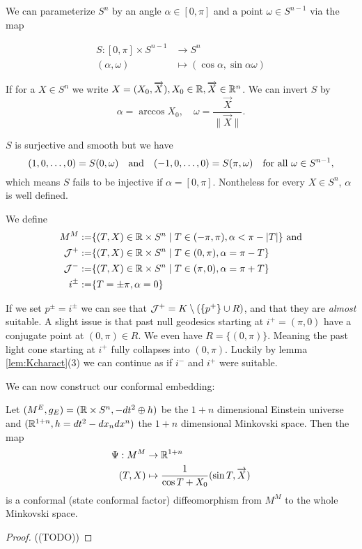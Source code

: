 \begin{remark}
We can parameterize $S^n$ by an angle $\alpha\in [0,\pi]$ and a point $\omega\in S^{n-1}$ via the map 

\begin{align*}
    S:[0,\pi]\times S^{n-1}&\to S^n \\
    (\alpha,\omega) &\mapsto (\cos \alpha, \sin \alpha \omega)
\end{align*}

If for a $X\in S^n$ we write $X=(X_0,\overrightarrow{X}), X_0\in \mathbb{R}, \overrightarrow{X}\in \mathbb{R}^n$. We can invert $S$ by 
\[
    \alpha = \arccos X_0, \quad \omega=\frac{\overrightarrow{X}}{\lVert\overrightarrow{X}\rVert}.
\]

$S$ is surjective and smooth but we have 
\[(1,0,\dots, 0) = S(0,\omega) \quad \text{and} \quad (-1,0,\dots,0)=S(\pi,\omega) \quad \text{for all }\omega\in {S^{n-1}},\]
which means $S$ fails to be injective if $\alpha = [0,\pi]$. Nontheless for every $X\in S^n$, $\alpha$ is well defined.
\end{remark}

We define 
\begin{align*}
    M^M:=&\{(T,X)\in \mathbb{R}\times S^n \mid T\in(-\pi,\pi), \alpha<\pi-\lvert T\rvert\} \text{ and}\\
    {\mathcal{J}}^+:=&\{(T,X)\in \mathbb{R}\times S^n \mid T\in(0,\pi), \alpha = \pi - T\}\\
    {\mathcal{J}}^-:=&\{(T,X)\in \mathbb{R}\times S^n \mid T\in(\pi,0), \alpha = \pi + T\}\\
    i^\pm :=& \{T=\pm\pi,\alpha=0\}
\end{align*}

If we set $p^\pm = i^\pm$ we can see that ${\mathcal{J}}^+ = K \setminus (\{p^+\} \cup R)$, and that they are \emph{almost} suitable. A slight issue is that past null geodesics starting at $i^+=(\pi, 0)$ have a conjugate point at $(0,\pi)\in R$. We even have $R = \{(0,\pi)\}$. Meaning the past light cone starting at $i^+$ fully collapses into $(0,\pi)$. Luckily by lemma \ref{lem:Kcharact}(3) we can continue as if $i^-$ and $i^+$ were suitable.

We can now construct our conformal embedding:
\begin{proposition}
Let $(M^E,g_E)=(\mathbb{R}\times S^n,-dt^2 \oplus h)$ be the $1+n$ dimensional Einstein universe and $(\mathbb{R}^{1+n},h=dt^2-dx_ndx^n)$ the $1+n$ dimensional Minkovski space. Then the map 
\begin{align}
    \Psi:M^M &\to \mathbb{R}^{1+n}\\
    (T,X) &\mapsto\frac{1}{\cos T + X_0}(\sin T,\overrightarrow{X})
\end{align}
is a conformal (state conformal factor) diffeomorphism from $M^M$ to the whole Minkovski space.
\end{proposition}
\begin{proof}
    ((TODO))
\end{proof}

